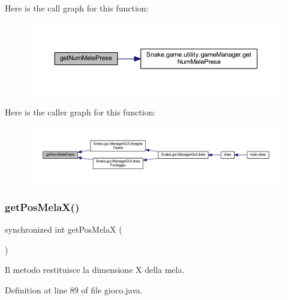 Here is the call graph for this function\+:
\nopagebreak
\begin{figure}[H]
\begin{center}
\leavevmode
\includegraphics[width=350pt]{class_snake_1_1game_1_1gioco_ab5f0b7048deda3c739c67b65166283cc_cgraph}
\end{center}
\end{figure}
Here is the caller graph for this function\+:
\nopagebreak
\begin{figure}[H]
\begin{center}
\leavevmode
\includegraphics[width=350pt]{class_snake_1_1game_1_1gioco_ab5f0b7048deda3c739c67b65166283cc_icgraph}
\end{center}
\end{figure}
\mbox{\label{class_snake_1_1game_1_1gioco_a64c70d61c15e0cb706c686ddfa016f4e}} 
\subsubsection{\texorpdfstring{get\+Pos\+Mela\+X()}{getPosMelaX()}}
{\footnotesize\ttfamily synchronized int get\+Pos\+MelaX (\begin{DoxyParamCaption}{ }\end{DoxyParamCaption})}



Il metodo restituisce la dimensione X della mela. 



Definition at line 89 of file gioco.\+java.

